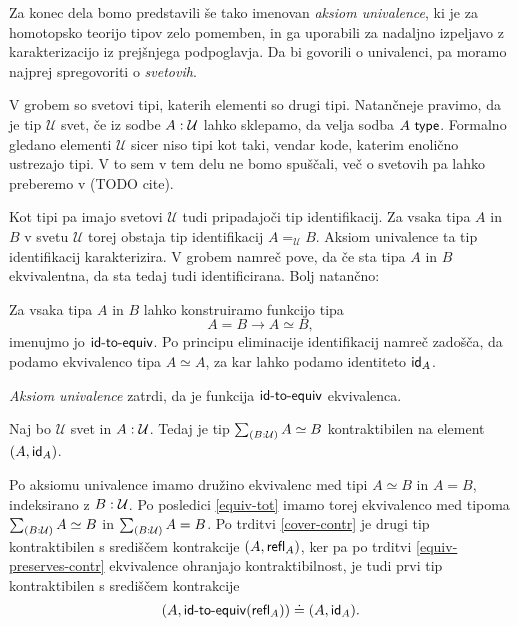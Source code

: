 Za konec dela bomo predstavili še tako imenovan \emph{aksiom univalence}, ki je za homotopsko teorijo tipov zelo pomemben, in ga uporabili za nadaljno izpeljavo z karakterizacijo iz prejšnjega podpoglavja. Da bi govorili o univalenci, pa moramo najprej spregovoriti o \emph{svetovih}.

V grobem so svetovi tipi, katerih elementi so drugi tipi. Natančneje pravimo, da je tip \(\mathcal{U}\) svet, če iz sodbe \(A : \mathcal{U}\) lahko sklepamo, da velja sodba \(A\ \textnormal{\textsf{type}}\). Formalno gledano elementi \(\mathcal{U}\) sicer niso tipi kot taki, vendar kode, katerim enolično ustrezajo tipi. V to sem v tem delu ne bomo spuščali, več o svetovih pa lahko preberemo v (TODO cite).

Kot tipi pa imajo svetovi \(\mathcal{U}\) tudi pripadajoči tip identifikacij. Za vsaka tipa \(A\) in \(B\) v svetu \(\mathcal{U}\) torej obstaja tip identifikacij \(A =_{\mathcal{U}} B\). Aksiom univalence ta tip identifikacij karakterizira. V grobem namreč pove, da če sta tipa \(A\) in \(B\) ekvivalentna, da sta tedaj tudi identificirana. Bolj natančno:

\begin{definicija}
  Za vsaka tipa \(A\) in \(B\) lahko konstruiramo funkcijo tipa \[A = B \to A \simeq B,\]
  imenujmo jo \(\textnormal{\textsf{id-to-equiv}}\).
  Po principu eliminacije identifikacij namreč zadošča, da podamo ekvivalenco tipa \(A \simeq A\), za kar lahko podamo identiteto \(\textnormal{\textsf{id}}_{A}\).

  \emph{Aksiom univalence} zatrdi, da je funkcija \(\textnormal{\textsf{id-to-equiv}}\) ekvivalenca.
\end{definicija}

\begin{posledica}
  \label{univ-contr}
  Naj bo \(\mathcal{U}\) svet in \(A : \mathcal{U}\). Tedaj je tip \(\textstyle \sum_{\left( B : \mathcal{U} \right)} A \simeq B\) kontraktibilen na element \((A, \textnormal{\textsf{id}}_{A})\).
\end{posledica}

\begin{dokaz}
  Po aksiomu univalence imamo družino ekvivalenc med tipi \(A \simeq B\) in \(A = B\), indeksirano z \(B : \mathcal{U}\). Po posledici \ref{equiv-tot} imamo torej ekvivalenco med tipoma \(\textstyle \sum_{\left( B : \mathcal{U} \right)} A \simeq B\) in \(\textstyle \sum_{\left( B : \mathcal{U} \right)} A = B\).
  Po trditvi \ref{cover-contr} je drugi tip kontraktibilen s središčem kontrakcije \((A, \textnormal{\textsf{refl}}_{A})\), ker pa po trditvi \ref{equiv-preserves-contr} ekvivalence ohranjajo kontraktibilnost, je tudi prvi tip kontraktibilen s središčem kontrakcije
  \[(A, \textnormal{\textsf{id-to-equiv}}(\textnormal{\textsf{refl}}_{A})) \doteq (A, \textnormal{\textsf{id}}_{A}).\]
\end{dokaz}


